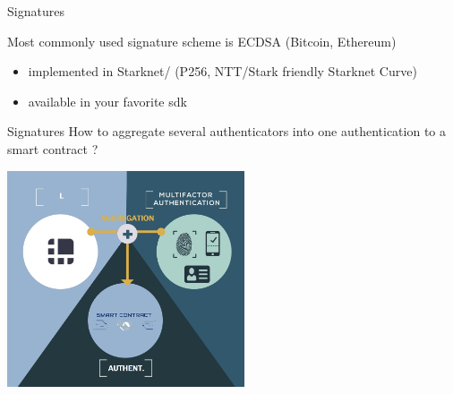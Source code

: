 \documentclass[aspectratio=43]{beamer}
\begin{document}
\begin{frame}{Signatures}
{      Most commonly used signature scheme is ECDSA (Bitcoin, Ethereum)
     \begin{itemize}
     \item implemented in Starknet/\href{https://github.com/starkware-libs/cairo-lang/tree/master/src/starkware/cairo/common}{} (P256, NTT/Stark friendly Starknet Curve)
     \item available in your favorite sdk
     \href{https://developers.ledger.com/docs/nano-app/crypto-api/ox__ec_8h/}{}
     
     \end{itemize} 
     }
    
    
\end{frame}
 \begin{frame}{Signatures}
 How to aggregate several authenticators into one authentication to a smart contract ?
 \begin{center}
        \includegraphics[width=7cm]{images/2fa.jpg}
        \end{center}
  
 \end{frame}
\end{document}
